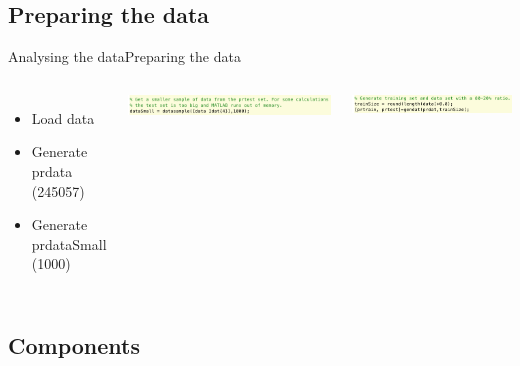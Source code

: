 \documentclass{beamer}
\begin{document}
\subsection{Preparing the data}

\begin{frame}{Analysing the data}{Preparing the data}
    \begin{columns}
    \begin{itemize}
        \item Load data 
        \item Generate prdata (245057)
        \item Generate prdataSmall (1000)
    \end{itemize}
        \includegraphics[scale=0.3]{smalldata.png}
        
        \includegraphics[scale=0.30]{training.png}
    \end{columns}
\end{frame}

\subsection{Components}
\end{document}
